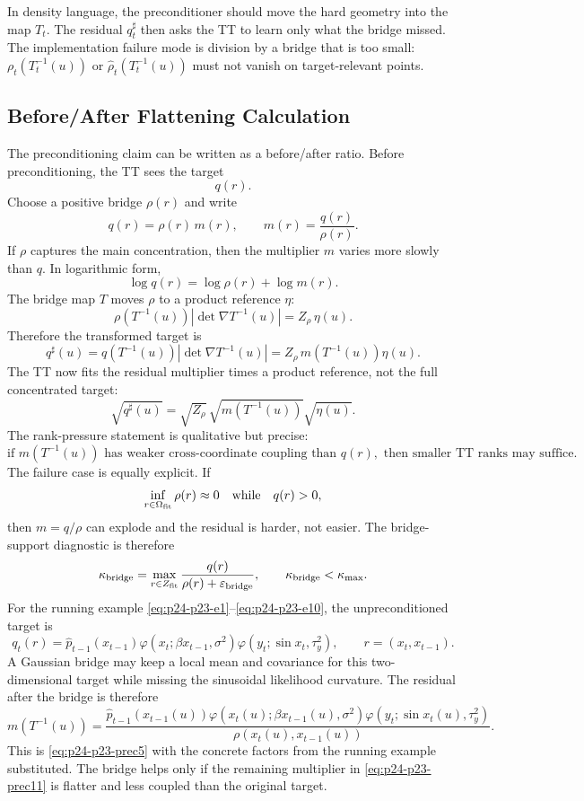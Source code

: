 \documentclass[11pt]{article}
\begin{document}
In density language, the preconditioner should move the hard geometry into the
map \(T_t\).  The residual \(q_t^\sharp\) then asks the TT to learn only what
the bridge missed.  The implementation failure mode is division by a bridge
that is too small: \(\rho_t(T_t^{-1}(u))\) or \(\widehat\rho_t(T_t^{-1}(u))\)
must not vanish on target-relevant points.

\subsection*{Before/After Flattening Calculation}

The preconditioning claim can be written as a before/after ratio.  Before
preconditioning, the TT sees the target
\[
    q(r).
    \label{eq:p24-p23-prec1}
\]
Choose a positive bridge \(\rho(r)\) and write
\[
    q(r)=\rho(r)\,m(r),
    \qquad
    m(r)=\frac{q(r)}{\rho(r)}.
    \label{eq:p24-p23-prec2}
\]
If \(\rho\) captures the main concentration, then the multiplier \(m\) varies
more slowly than \(q\).  In logarithmic form,
\[
    \log q(r)=\log\rho(r)+\log m(r).
    \label{eq:p24-p23-prec3}
\]
The bridge map \(T\) moves \(\rho\) to a product reference \(\eta\):
\[
    \rho(T^{-1}(u))\left|\det\nabla T^{-1}(u)\right|
    =
    Z_\rho\,\eta(u).
    \label{eq:p24-p23-prec4}
\]
Therefore the transformed target is
\[
    q^\sharp(u)
    =
    q(T^{-1}(u))\left|\det\nabla T^{-1}(u)\right|
    =
    Z_\rho\,m(T^{-1}(u))\eta(u).
    \label{eq:p24-p23-prec5}
\]
The TT now fits the residual multiplier times a product reference, not the
full concentrated target:
\[
    \sqrt{q^\sharp(u)}
    =
    \sqrt{Z_\rho}\,
    \sqrt{m(T^{-1}(u))}
    \sqrt{\eta(u)}.
    \label{eq:p24-p23-prec6}
\]
The rank-pressure statement is qualitative but precise:
\[
    \text{if }m(T^{-1}(u))\text{ has weaker cross-coordinate coupling than }q(r),
    \text{ then smaller TT ranks may suffice.}
    \label{eq:p24-p23-prec7}
\]
The failure case is equally explicit.  If
\[
    \inf_{r\in\Omega_{\rm fit}}\rho(r)\approx0
    \quad\text{while}\quad q(r)>0,
    \label{eq:p24-p23-prec8}
\]
then \(m=q/\rho\) can explode and the residual is harder, not easier.  The
bridge-support diagnostic is therefore
\[
    \kappa_{\rm bridge}
    =
    \max_{r\in Z_{\rm fit}}\frac{q(r)}{\rho(r)+\varepsilon_{\rm bridge}},
    \qquad
    \kappa_{\rm bridge}<\kappa_{\max}.
    \label{eq:p24-p23-prec9}
\]
For the running example \eqref{eq:p24-p23-e1}--\eqref{eq:p24-p23-e10}, the unpreconditioned target is
\[
    q_t(r)
    =
    \widehat p_{t-1}(x_{t-1})
    \varphi(x_t;\beta x_{t-1},\sigma^2)
    \varphi(y_t;\sin x_t,\tau_y^2),
    \qquad
    r=(x_t,x_{t-1}).
    \label{eq:p24-p23-prec10}
\]
A Gaussian bridge may keep a local mean and covariance for this
two-dimensional target while missing the sinusoidal likelihood curvature.  The
residual after the bridge is therefore
\[
    m(T^{-1}(u))
    =
    \frac{
    \widehat p_{t-1}(x_{t-1}(u))
    \varphi(x_t(u);\beta x_{t-1}(u),\sigma^2)
    \varphi(y_t;\sin x_t(u),\tau_y^2)}
    {\rho(x_t(u),x_{t-1}(u))}.
    \label{eq:p24-p23-prec11}
\]
This is \eqref{eq:p24-p23-prec5} with the concrete factors from the running example
substituted.  The bridge helps only if the remaining multiplier in
\eqref{eq:p24-p23-prec11} is flatter and less coupled than the original target.
\end{document}
